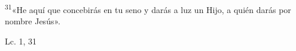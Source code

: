 \documentclass[../../rosario.tex]{subfiles}
\begin{document}
    \textsuperscript{31}«He aquí que concebirás en tu seno y darás a luz un Hijo, a quién darás por nombre Jesús».
    \begin{flushright}
    Lc. 1, 31
    \end{flushright}
\end{document}
